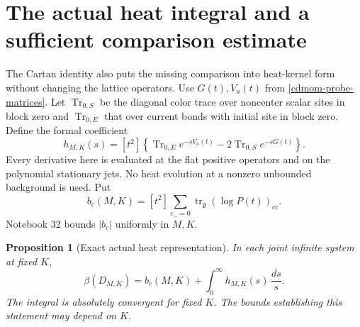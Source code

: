 \documentclass[11pt]{article}
\newtheorem{proposition}[theorem]{Proposition}
\theoremstyle{remark}
\begin{document}
\section{The actual heat integral and a sufficient comparison estimate}
\label{ahc-section}

The Cartan identity also puts the missing comparison into
heat-kernel form without changing the lattice operators.
Use \(G(t),V_a(t)\) from \eqref{cdmom-probe-matrices}.
Let \(\operatorname{Tr}_{0,S}\) be the diagonal color trace
over noncenter scalar sites in block zero and
\(\operatorname{Tr}_{0,E}\) that over current bonds with
initial site in block zero. Define the formal coefficient
\begin{equation}
 h_{M,K}(s)=[t^2]\left\{
   \operatorname{Tr}_{0,E}e^{-sV_a(t)}
                  -2\operatorname{Tr}_{0,S}e^{-sG(t)}
                         \right\}.
 \label{ahc-h-definition}
\end{equation}
Every derivative here is evaluated at the flat positive
operators and on the polynomial stationary jets. No
heat evolution at a nonzero unbounded background is
used. Put
\[
 b_c(M,K)=[t^2]\sum_{c_-=0}
           \operatorname{tr}_{\mathfrak g}(\log P(t))_{cc}.
\]
Notebook 32 bounds \(|b_c|\) uniformly in \(M,K\).

\begin{proposition}[Exact actual heat representation]
\label{ahc-identity}
In each joint infinite system at fixed \(K\),
\begin{equation}
 \beta(D_{M,K})=b_c(M,K)
                   +\int_0^\infty h_{M,K}(s)\,\frac{ds}{s}.
 \label{ahc-exact}
\end{equation}
The integral is absolutely convergent for fixed \(K\).
The bounds establishing this statement may depend on \(K\).
\end{proposition}
\end{document}
